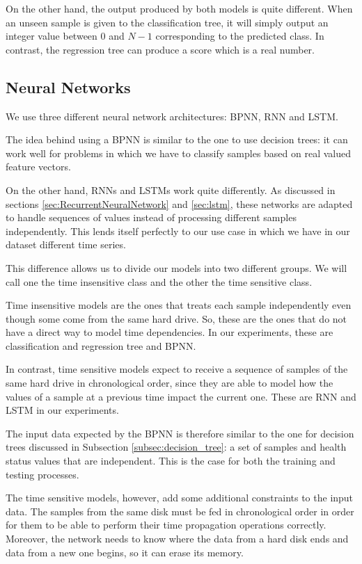 On the other hand, the output produced by both models is quite different.
When an unseen sample is given to the classification tree, it will simply output an integer value between $0$ and $N-1$ corresponding to the predicted class.
In contrast, the regression tree can produce a score which is a real number.

\subsection{Neural Networks}\label{subsec:nn}

We use three different neural network architectures: BPNN, RNN and LSTM.

The idea behind using a BPNN is similar to the one to use decision trees: it can work well for problems in which we have to classify samples based on real valued feature vectors.

On the other hand, RNNs and LSTMs work quite differently.
As discussed in sections \ref{sec:RecurrentNeuralNetwork} and \ref{sec:lstm}, these networks are adapted to handle sequences of values instead of processing different samples independently.
This lends itself perfectly to our use case in which we have in our dataset different time series. 

This difference allows us to divide our models into two different groups.
We will call one the time insensitive class and the other the time sensitive class. 

Time insensitive models are the ones that treats each sample independently even though some come from the same hard drive.
So, these are the ones that do not have a direct way to model time dependencies.
In our experiments, these are classification and regression tree and BPNN.

In contrast, time sensitive models expect to receive a sequence of samples of the same hard drive in chronological order, since they are able to model how the values of a sample at a previous time impact the current one.
These are RNN and LSTM in our experiments.

The input data expected by the BPNN is therefore similar to the one for decision trees discussed in Subsection \ref{subsec:decision_tree}: a set of samples and health status values that are independent.
This is the case for both the training and testing processes.

The time sensitive models, however, add some additional constraints to the input data.
The samples from the same disk must be fed in chronological order in order for them to be able to perform their time propagation operations correctly.
Moreover, the network needs to know where the data from a hard disk ends and data from a new one begins, so it can erase its memory.


